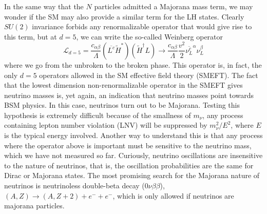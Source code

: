 In the same way that the $N$ particles admitted a Majorana mass term, we may wonder if the SM may also provide a similar term for the LH states. Clearly $SU(2)$ invariance forbids any renormalizable operator that would give rise to this term, but at $d=5$, we can write the so-called Weinberg operator
%
\begin{equation}
 \mathscr{L}_{d=5} = \frac{c_{\alpha\beta}}{\Lambda} \left( \overline{L^c} \widetilde{H}^* \right) \left( \widetilde{H}^\dagger L  \right) \to  \frac{c_{\alpha\beta}}{\Lambda} \frac{v^2}{2} \overline{\nu_L^c}^\alpha \nu_L^\beta
\end{equation}
%
where we go from the unbroken to the broken phase. This operator is, in fact, the only $d=5$ operators allowed in the SM effective field theory (SMEFT). The fact that the lowest dimension non-renormalizable operator in the SMEFT gives neutrino masses is, yet again, an indication that neutrino masses point towards BSM physics. In this case, neutrinos turn out to be Majorana. Testing this hypothesis is extremely difficult because of the smallness of $m_\nu$, any process containing lepton number violation (LNV) will be suppressed by $m_\nu^2/E^2$, where $E$ is the typical energy involved. Another way to understand this is that any process where the operator above is important must be sensitive to the neutrino mass, which we have not measured so far. Curiously, neutrino oscillations are insensitive to the nature of neutrinos, that is, the oscillation probabilities are the same for Dirac or Majorana states. The most promising search for the Majorana nature of neutrinos is neutrinoless double-beta decay ($0\nu\beta\beta$), $(A,Z)\to(A,Z+2) + e^- + e^-$, which is only allowed if neutrinos are majorana particles. 


